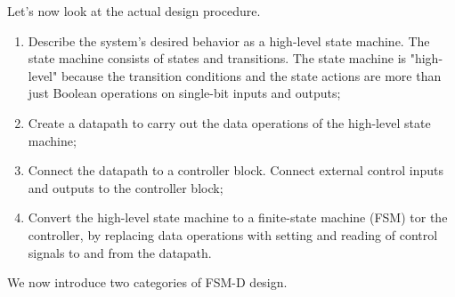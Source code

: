 \documentclass[a4paper,11pt]{article}
\begin{document}
Let's now look at the actual design procedure.
\begin{enumerate}
	\item
	      Describe the system's desired behavior as a high-level state machine.
	      The state machine consists of states and transitions. The state machine
	      is "high-level" because the transition conditions and the state actions
	      are more than just Boolean operations on single-bit inputs and outputs;

	\item
	      Create a datapath to carry out the data operations of the high-level
	      state machine;

	\item
	      Connect the datapath to a controller block. Connect external control
	      inputs and outputs to the controller block;

	\item

	      Convert the high-level state machine to a finite-state machine (FSM)
	      tor the controller, by replacing data operations with setting and reading
	      of control signals to and from the datapath.
\end{enumerate}

\par \smallskip

We now introduce two categories of FSM-D design.
\end{document}
